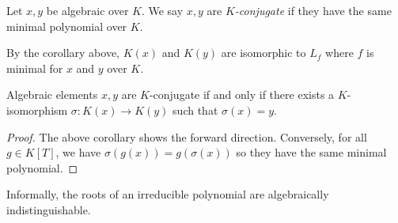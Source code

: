 \begin{definition}
	Let \( x, y \) be algebraic over \( K \).
	We say \( x, y \) are \emph{\( K \)-conjugate} if they have the same minimal polynomial over \( K \).
\end{definition}
By the corollary above, \( K(x) \) and \( K(y) \) are isomorphic to \( L_f \) where \( f \) is minimal for \( x \) and \( y \) over \( K \).
\begin{corollary}
	Algebraic elements \( x, y \) are \( K \)-conjugate if and only if there exists a \( K \)-isomorphism \( \sigma \colon K(x) \to K(y) \) such that \( \sigma(x) = y \).
\end{corollary}
\begin{proof}
	The above corollary shows the forward direction.
	Conversely, for all \( g \in K[T] \), we have \( \sigma(g(x)) = g(\sigma(x)) \) so they have the same minimal polynomial.
\end{proof}
Informally, the roots of an irreducible polynomial are algebraically indistinguishable.


